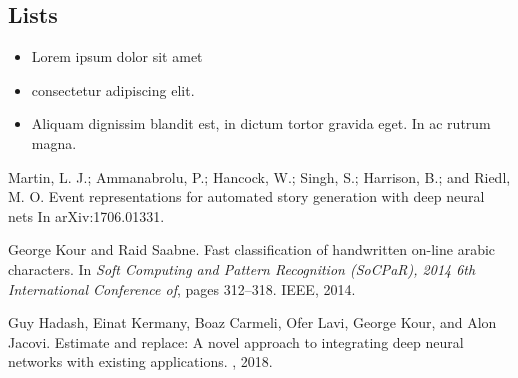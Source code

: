 \documentclass{article}
\begin{document}
\subsection{Lists}
\begin{itemize}
\item Lorem ipsum dolor sit amet
\item consectetur adipiscing elit. 
\item Aliquam dignissim blandit est, in dictum tortor gravida eget. In ac rutrum magna.
\end{itemize}


  


\begin{thebibliography}{1}

Martin, L. J.; Ammanabrolu, P.; Hancock, W.; Singh, S.; Harrison, B.; and Riedl, M. O. 
\newblock Event representations for automated story generation with deep neural nets
\newblock In arXiv:1706.01331.

George Kour and Raid Saabne.
\newblock Fast classification of handwritten on-line arabic characters.
\newblock In {\em Soft Computing and Pattern Recognition (SoCPaR), 2014 6th
  International Conference of}, pages 312--318. IEEE, 2014.

Guy Hadash, Einat Kermany, Boaz Carmeli, Ofer Lavi, George Kour, and Alon
  Jacovi.
\newblock Estimate and replace: A novel approach to integrating deep neural
  networks with existing applications.
, 2018.

\end{thebibliography}
\end{document}
